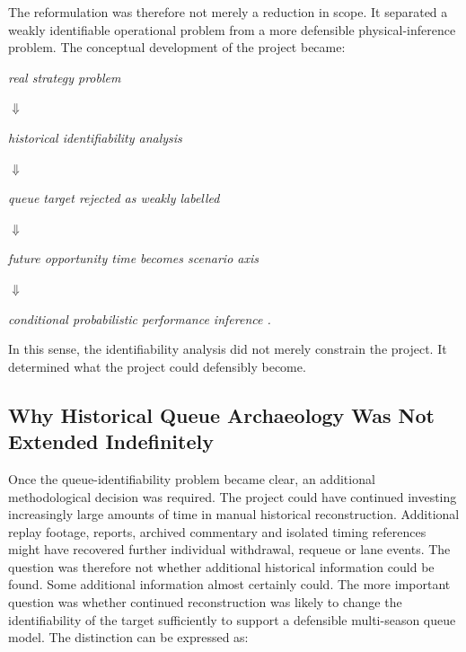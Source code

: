 The reformulation was therefore not merely a reduction in scope. It separated a weakly identifiable operational problem from a more defensible physical-inference problem. The conceptual development of the project became:

\begin{center}\textit{real strategy problem}\end{center}

\begin{center}\textit{\ensuremath{\Downarrow}}\end{center}

\begin{center}\textit{historical identifiability analysis}\end{center}

\begin{center}\textit{\ensuremath{\Downarrow}}\end{center}

\begin{center}\textit{queue target rejected as weakly labelled}\end{center}

\begin{center}\textit{\ensuremath{\Downarrow}}\end{center}

\begin{center}\textit{future opportunity time becomes scenario axis}\end{center}

\begin{center}\textit{\ensuremath{\Downarrow}}\end{center}

\begin{center}\textit{conditional probabilistic performance inference .}\end{center}

In this sense, the identifiability analysis did not merely constrain the project. It determined what the project could defensibly become.

\subsection{Why Historical Queue Archaeology Was Not Extended Indefinitely}
Once the queue-identifiability problem became clear, an additional methodological decision was required. The project could have continued investing increasingly large amounts of time in manual historical reconstruction. Additional replay footage, reports, archived commentary and isolated timing references might have recovered further individual withdrawal, requeue or lane events. The question was therefore not whether additional historical information could be found. Some additional information almost certainly could. The more important question was whether continued reconstruction was likely to change the identifiability of the target sufficiently to support a defensible multi-season queue model. The distinction can be expressed as:

